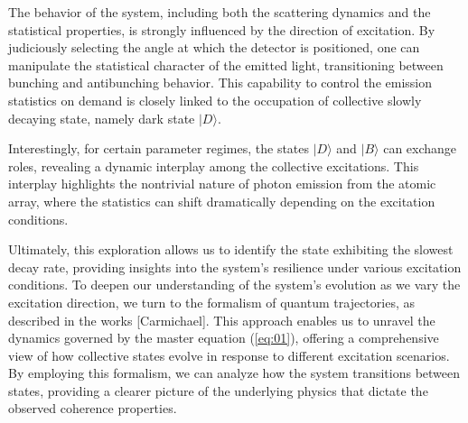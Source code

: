 \documentclass[aps,prl,twocolumn,superscriptaddress,showpacs,amsmath,amssymb]{revtex4-2}
\begin{document}
The behavior of the system, including both the scattering dynamics and the statistical properties, is strongly influenced by the direction of excitation. By judiciously selecting the angle at which the detector is positioned, one can manipulate the statistical character of the emitted light,
transitioning between bunching and antibunching behavior. This capability to control the emission statistics on demand is closely linked to the occupation of collective slowly decaying state, namely dark state $|D\rangle$.

Interestingly, for certain parameter regimes, the states $|D\rangle$ and $|B\rangle$ can exchange roles, revealing a dynamic interplay among the collective excitations. This interplay highlights the nontrivial nature of photon emission from the atomic array, where the statistics can shift dramatically depending on the excitation conditions.

Ultimately, this exploration allows us to identify the state exhibiting the slowest decay rate, providing insights into the system's resilience under various excitation conditions. To deepen our understanding of the system's evolution as we vary the excitation direction, we turn to the formalism of
quantum trajectories, as described in the works [Carmichael]. This approach enables us to unravel the dynamics governed by the master equation (\ref{eq:01}), offering a comprehensive view of how collective states evolve in response to different excitation scenarios. By employing this formalism, we can analyze how the system transitions between states, providing a clearer picture of the underlying physics that dictate the observed coherence properties.
\end{document}
